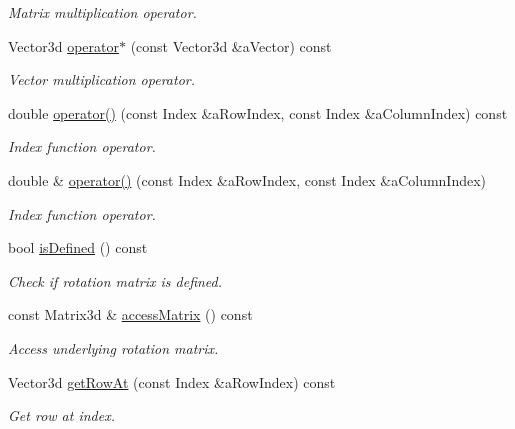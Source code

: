 \begin{DoxyCompactItemize}
\begin{DoxyCompactList}\small\item\em Matrix multiplication operator. \end{DoxyCompactList}\item 
Vector3d \hyperlink{classlibrary_1_1math_1_1geom_1_1d3_1_1trf_1_1rot_1_1_rotation_matrix_a1b21bbea44cea009ae0533e206b202ff}{operator$\ast$} (const Vector3d \&a\+Vector) const
\begin{DoxyCompactList}\small\item\em Vector multiplication operator. \end{DoxyCompactList}\item 
double \hyperlink{classlibrary_1_1math_1_1geom_1_1d3_1_1trf_1_1rot_1_1_rotation_matrix_ad4a32ff81978cb60f2034661ea00d390}{operator()} (const Index \&a\+Row\+Index, const Index \&a\+Column\+Index) const
\begin{DoxyCompactList}\small\item\em Index function operator. \end{DoxyCompactList}\item 
double \& \hyperlink{classlibrary_1_1math_1_1geom_1_1d3_1_1trf_1_1rot_1_1_rotation_matrix_a2b6c7d6fe4770c59f2e1bc369798a36a}{operator()} (const Index \&a\+Row\+Index, const Index \&a\+Column\+Index)
\begin{DoxyCompactList}\small\item\em Index function operator. \end{DoxyCompactList}\item 
bool \hyperlink{classlibrary_1_1math_1_1geom_1_1d3_1_1trf_1_1rot_1_1_rotation_matrix_a8a3cb48f3cda99de31c763295030ffcc}{is\+Defined} () const
\begin{DoxyCompactList}\small\item\em Check if rotation matrix is defined. \end{DoxyCompactList}\item 
const Matrix3d \& \hyperlink{classlibrary_1_1math_1_1geom_1_1d3_1_1trf_1_1rot_1_1_rotation_matrix_a32eda074386b31ef093b33c960361276}{access\+Matrix} () const
\begin{DoxyCompactList}\small\item\em Access underlying rotation matrix. \end{DoxyCompactList}\item 
Vector3d \hyperlink{classlibrary_1_1math_1_1geom_1_1d3_1_1trf_1_1rot_1_1_rotation_matrix_a0eedb1df4a290e649486c1d7b0a8fba9}{get\+Row\+At} (const Index \&a\+Row\+Index) const
\begin{DoxyCompactList}\small\item\em Get row at index. \end{DoxyCompactList}\item 

\end{DoxyCompactItemize}
